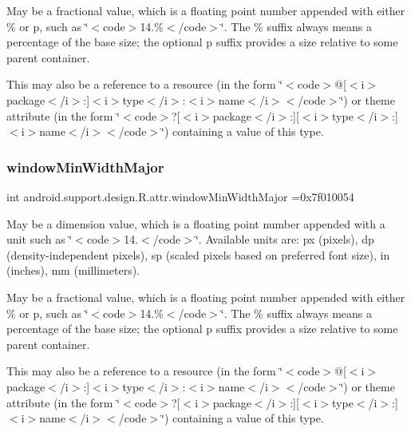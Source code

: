 May be a fractional value, which is a floating point number appended with either \% or p, such as \char`\"{}$<$code$>$14.\%$<$/code$>$\char`\"{}. The \% suffix always means a percentage of the base size; the optional p suffix provides a size relative to some parent container. 

This may also be a reference to a resource (in the form \char`\"{}$<$code$>$@\mbox{[}$<$i$>$package$<$/i$>$\+:\mbox{]}$<$i$>$type$<$/i$>$\+:$<$i$>$name$<$/i$>$$<$/code$>$\char`\"{}) or theme attribute (in the form \char`\"{}$<$code$>$?\mbox{[}$<$i$>$package$<$/i$>$\+:\mbox{]}\mbox{[}$<$i$>$type$<$/i$>$\+:\mbox{]}$<$i$>$name$<$/i$>$$<$/code$>$\char`\"{}) containing a value of this type. \mbox{\label{classandroid_1_1support_1_1design_1_1R_1_1attr_a57d319f552fc373780a074bf8ab8d077}} 
\subsubsection{\texorpdfstring{window\+Min\+Width\+Major}{windowMinWidthMajor}}
{\footnotesize\ttfamily int android.\+support.\+design.\+R.\+attr.\+window\+Min\+Width\+Major =0x7f010054\hspace{0.3cm}{\ttfamily [static]}}

May be a dimension value, which is a floating point number appended with a unit such as \char`\"{}$<$code$>$14.\+5sp$<$/code$>$\char`\"{}. Available units are\+: px (pixels), dp (density-\/independent pixels), sp (scaled pixels based on preferred font size), in (inches), mm (millimeters). 

May be a fractional value, which is a floating point number appended with either \% or p, such as \char`\"{}$<$code$>$14.\%$<$/code$>$\char`\"{}. The \% suffix always means a percentage of the base size; the optional p suffix provides a size relative to some parent container. 

This may also be a reference to a resource (in the form \char`\"{}$<$code$>$@\mbox{[}$<$i$>$package$<$/i$>$\+:\mbox{]}$<$i$>$type$<$/i$>$\+:$<$i$>$name$<$/i$>$$<$/code$>$\char`\"{}) or theme attribute (in the form \char`\"{}$<$code$>$?\mbox{[}$<$i$>$package$<$/i$>$\+:\mbox{]}\mbox{[}$<$i$>$type$<$/i$>$\+:\mbox{]}$<$i$>$name$<$/i$>$$<$/code$>$\char`\"{}) containing a value of this type. \mbox{\label{classandroid_1_1support_1_1design_1_1R_1_1attr_a0d5fe2b5cabad2d90ed3efb075a1ac99}} 
